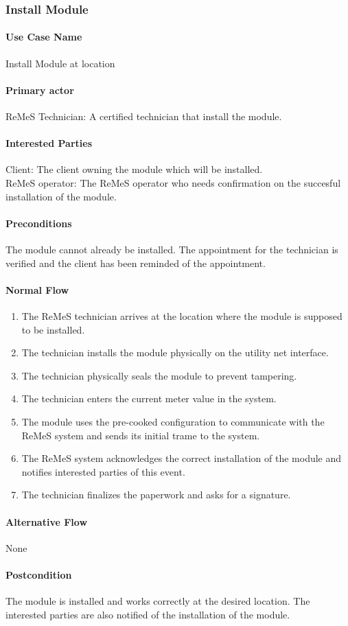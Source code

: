 \subsubsection{Install Module}

\paragraph{Use Case Name}
Install Module at location
\paragraph{Primary actor}
ReMeS Technician: A certified technician that install the module.
\paragraph{Interested Parties}
Client: The client owning the module which will be installed.\\
ReMeS operator: The ReMeS operator who needs confirmation on the succesful installation of the module.
\paragraph{Preconditions}
The module cannot already be installed. The appointment for the technician is verified and 
the client has been reminded of the appointment.
\paragraph{Normal Flow}
\begin{enumerate}
	\item The ReMeS technician arrives at the location where the module is supposed to be installed.
	\item The technician installs the module physically on the utility net interface.
	\item The technician physically seals the module to prevent tampering.
	\item The technician enters the current meter value in the system.
	\item The module uses the pre-cooked configuration to communicate with the ReMeS system and sends its initial trame to the system. 
	\item The ReMeS system acknowledges the correct installation of the module and notifies interested parties of this event.
	\item The technician finalizes the paperwork and asks for a signature.
\end{enumerate}

\paragraph{Alternative Flow}
None

\paragraph{Postcondition}
The module is installed and works correctly at the desired location. The interested parties are also notified of the installation of the module.
